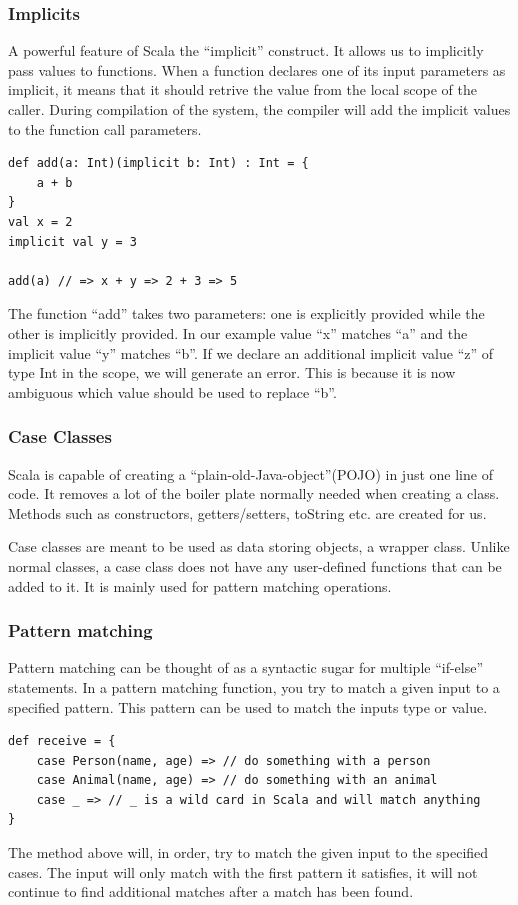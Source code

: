 \subsubsection{Implicits}
A powerful feature of Scala the ``implicit'' construct. It allows us to implicitly pass values to functions. When a function declares one of its input parameters as implicit, it means that it should retrive the value from the local scope of the caller. During compilation of the system, the compiler will add the implicit values to the function call parameters.

\begin{lstlisting}[style=myScalastyle]
def add(a: Int)(implicit b: Int) : Int = {
    a + b
}
val x = 2
implicit val y = 3

add(a) // => x + y => 2 + 3 => 5
\end{lstlisting}
The function ``add'' takes two parameters: one is explicitly provided while the other is implicitly provided. In our example value ``x'' matches ``a'' and the implicit value ``y'' matches  ``b''. If we declare an additional implicit value ``z'' of type Int in the scope, we will generate an error. This is because it is now ambiguous which value should be used to replace ``b''. 

\subsubsection{Case Classes}
Scala is capable of creating a ``plain-old-Java-object''(POJO) in just one line of code. It removes a lot of the boiler plate normally needed when creating a class. Methods such as constructors, getters/setters, toString etc. are created for us.

Case classes are meant to be used as data storing objects, a wrapper class. Unlike normal classes, a case class does not have any user-defined functions that can be added to it. It is mainly used for pattern matching operations.

\subsubsection{Pattern matching}
Pattern matching \cite{emir2007matching} can be thought of as a syntactic sugar for multiple ``if-else'' statements. In a pattern matching function, you try to match a given input to a specified pattern. This pattern can be used to match the inputs type or value.

\begin{lstlisting}[style=myScalastyle]
def receive = {
    case Person(name, age) => // do something with a person
    case Animal(name, age) => // do something with an animal
    case _ => // _ is a wild card in Scala and will match anything
}
\end{lstlisting}
The method above will, in order, try to match the given input to the specified cases. The input will only match with the first pattern it satisfies, it will not continue to find additional matches after a match has been found.
 

